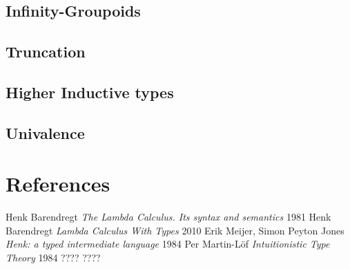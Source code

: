 \documentclass[11pt,oneside]{article}
\begin{document}
\subsection{Infinity-Groupoids}
\subsection{Truncation}
\subsection{Higher Inductive types}
\subsection{Univalence}

\newpage
\section{References}
\begin{thebibliography}{9}

      Henk Barendregt \textit{The Lambda Calculus. Its syntax and semantics} 1981
      Henk Barendregt \textit{Lambda Calculus With Types} 2010
       Erik Meijer, Simon Peyton Jones \textit{Henk: a typed intermediate language} 1984
        Per Martin-Löf \textit{Intuitionistic Type Theory} 1984
 ????
 ????

\end{thebibliography}
\end{document}

